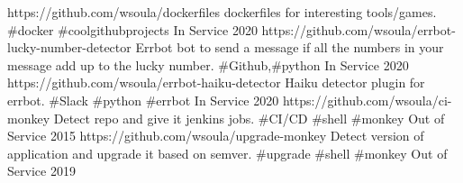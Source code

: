 
\begin{cvhonors}

  \cvhonor
    {https://github.com/wsoula/dockerfiles} %
    {dockerfiles for interesting tools/games. \#docker \#coolgithubprojects}
    {In Service} %
    {2020} %
  \cvhonor
    {https://github.com/wsoula/errbot-lucky-number-detector} %
    {Errbot bot to send a message if all the numbers in your message add up to the lucky number. \#Github,\#python}
    {In Service} %
    {2020} %
  \cvhonor
    {https://github.com/wsoula/errbot-haiku-detector} %
    {Haiku detector plugin for errbot.  \#Slack \#python \#errbot}
    {In Service} %
    {2020} %
  \cvhonor
    {https://github.com/wsoula/ci-monkey} %
    {Detect repo and give it jenkins jobs.  \#CI/CD \#shell \#monkey}
    {Out of Service} %
    {2015} %
  \cvhonor
    {https://github.com/wsoula/upgrade-monkey} %
    {Detect version of application and upgrade it based on semver.  \#upgrade \#shell \#monkey}
    {Out of Service} %
    {2019} %
\end{cvhonors}
